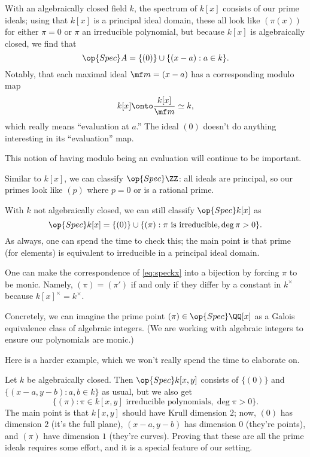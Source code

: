 \documentclass[../notes.tex]{subfiles}
\begin{document}
\begin{example}
	With an algebraically closed field $k$, the spectrum of $k[x]$ consists of our prime ideals; using that $k[x]$ is a principal ideal domain, these all look like $(\pi(x))$ for either $\pi=0$ or $\pi$ an irreducible polynomial, but because $k[x]$ is algebraically closed, we find that
	\[\op{Spec}A=\{(0)\}\cup\{(x-a):a\in k\}.\]
	Notably, that each maximal ideal $\mf m=(x-a)$ has a corresponding modulo map
	\[k[x]\onto\frac{k[x]}{\mf m}\simeq k,\]
	which really means ``evaluation at $a$.'' The ideal $(0)$ doesn't do anything interesting in its ``evaluation'' map.
\end{example}
This notion of having modulo being an evaluation will continue to be important.
\begin{ex}
	Similar to $k[x]$, we can classify $\op{Spec}\ZZ$: all ideals are principal, so our primes look like $(p)$ where $p=0$ or is a rational prime.
\end{ex}
\begin{example}
	With $k$ not algebraically closed, we can still classify $\op{Spec}k[x]$ as
	\begin{equation}
		\op{Spec}k[x]=\{(0)\}\cup\{(\pi):\pi\text{ is irreducible},\deg\pi>0\}. \label{eq:speckx}
	\end{equation}
	As always, one can spend the time to check this; the main point is that prime (for elements) is equivalent to irreducible in a principal ideal domain.
\end{example}
\begin{remark}
	One can make the correspondence of \autoref{eq:speckx} into a bijection by forcing $\pi$ to be monic. Namely, $(\pi)=(\pi')$ if and only if they differ by a constant in $k^\times$ because $k[x]^\times=k^\times$.
\end{remark}
\begin{example}
	Concretely, we can imagine the prime point $(\pi)\in\op{Spec}\QQ[x]$ as a Galois equivalence class of algebraic integers. (We are working with algebraic integers to ensure our polynomials are monic.)
\end{example}
Here is a harder example, which we won't really spend the time to elaborate on.
\begin{example}
	Let $k$ be algebraically closed. Then $\op{Spec}k[x,y]$ consists of $\{(0)\}$ and $\{(x-a,y-b):a,b\in k\}$ as usual, but we also get
	\[\{(\pi):\pi\in k[x,y]\text{ irreducible polynomials},\deg\pi>0\}.\]
	The main point is that $k[x,y]$ should have Krull dimension $2$; now, $(0)$ has dimension $2$ (it's the full plane), $(x-a,y-b)$ has dimension $0$ (they're points), and $(\pi)$ have dimension $1$ (they're curves). Proving that these are all the prime ideals requires some effort, and it is a special feature of our setting.
\end{example}
\end{document}
